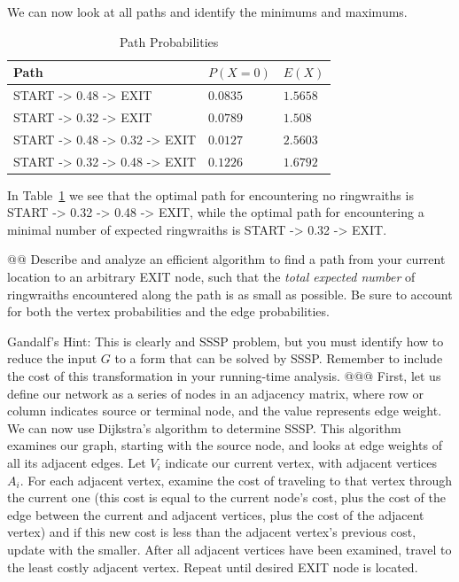 \documentclass[10pt]{article}\usepackage[]{graphicx}\usepackage[]{xcolor}
\newenvironment{knitrout}{}{} %
\begin{document}
\begin{easylist}[enumerate]
\begin{knitrout}
\end{knitrout}


    We can now look at all paths and identify the minimums and maximums.

    \begin{table}[H]
        \centering
        \begin{tabular}{|l|l|l|}
            \hline
            Path & $P(X=0)$ & $E(X)$\\
            \hline
            {\ttfamily START -> 0.48 -> EXIT} &
                $0.0835$ &
                $1.5658$\\
            \hline
            {\ttfamily START -> 0.32 -> EXIT} &
                $0.0789$ &
                $1.508$\\
            \hline
            {\ttfamily START -> 0.48 -> 0.32 -> EXIT} &
                $0.0127$ &
                $2.5603$\\
            \hline
            {\ttfamily START -> 0.32 -> 0.48 -> EXIT} &
                $0.1226$ &
                $1.6792$\\
            \hline
        \end{tabular}
        \caption{Path Probabilities}
        \label{table:ring_probs}
    \end{table}

    In Table~\ref{table:ring_probs} we see that the optimal path for encountering no ringwraiths is {\ttfamily START ->
    0.32 -> 0.48 -> EXIT}, while the optimal path for encountering a minimal number of expected ringwraiths is {\ttfamily START
    -> 0.32 -> EXIT}.

    @@ Describe and analyze an efficient algorithm to find a path from your current location to an arbitrary EXIT node,
    such that the \textit{total expected number} of ringwraiths encountered along the path is as small as possible. Be
    sure to account for both the vertex probabilities and the edge probabilities.

    Gandalf's Hint: This is clearly and SSSP problem, but you must identify how to reduce the input $G$ to a form that
    can be solved by SSSP. Remember to include the cost of this transformation in your running-time analysis.
    @@@ First, let us define our network as a series of nodes in an adjacency matrix, where row or column indicates
    source or terminal node, and the value represents edge weight. We can now use Dijkstra's algorithm to determine
    SSSP. This algorithm examines our graph, starting with the source node, and looks at edge weights of all its
    adjacent edges. Let $V_i$ indicate our current vertex, with adjacent vertices $A_i$. For each adjacent vertex,
    examine the cost of traveling to that vertex through the current one (this cost is equal to the current node's cost,
    plus the cost of the edge between the current and adjacent vertices, plus the cost of the adjacent vertex) and if
    this new cost is less than the adjacent vertex's previous cost, update with the smaller. After all adjacent vertices
    have been examined, travel to the least costly adjacent vertex. Repeat until desired EXIT node is located.\newline


\end{easylist}
\end{document}
